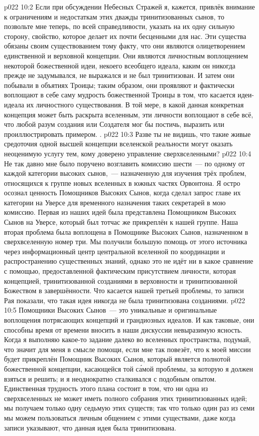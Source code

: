 \vs p022 10:2 \pc Если при обсуждении Небесных Стражей я, кажется, привлёк внимание к ограничениям и недостаткам этих дважды тринитизованных сынов, то позвольте мне теперь, по всей справедливости, указать на их одну сильную сторону, свойство, которое делает их почти бесценными для нас. Эти существа обязаны своим существованием тому факту, что они являются олицетворением единственной и верховной концепции. Они являются личностным воплощением некоторой божественной идеи, некоего всеобщего идеала, каким он никогда прежде не задумывался, не выражался и не был тринитизован. И затем они побывали в объятиях Троицы; таким образом, они проявляют и фактически воплощают в себе саму мудрость божественной Троицы в том, что касается идеи\hyp{}идеала их личностного существования. В той мере, в какой данная конкретная концепция может быть раскрыта вселенным, эти личности воплощают в себе всё, что любой разум создания или Создателя мог бы постичь, выразить или проиллюстрировать примером. .
\vs p022 10:3 Разве ты не видишь, что такие живые средоточия одной высшей концепции вселенской реальности могут оказать неоценимую услугу тем, кому доверено управление сверхвселенными?
\vs p022 10:4 \pc Не так давно мне было поручено возглавить комиссию шести~--- по одному от каждой категории высоких сынов,~--- назначенную для изучения трёх проблем, относящихся к группе новых вселенных в южных частях Орвонтона. Я остро осознал ценность Помощников Высоких Сынов, когда сделал запрос главе их категории на Уверсе для временного назначения таких секретарей в мою комиссию. Первая из наших идей была представлена Помощником Высоких Сынов на Уверсе, который был тотчас же прикреплён к нашей группе. Наша вторая проблема была воплощена в Помощнике Высоких Сынов, назначенном в сверхвселенную номер три. Мы получили большую помощь от этого источника через информационный центр центральной вселенной по координации и распространению существенных знаний, однако это не идёт ни в какое сравнение с помощью, предоставленной фактическим присутствием личности, которая  концепцией, тринитизованной созданиями в верховности и тринитизованной Божеством в завершённости. Что касается нашей третьей проблемы, то записи Рая показали, что такая идея никогда не была тринитизована созданиями.
\vs p022 10:5 \pc Помощники Высоких Сынов~--- это уникальные и оригинальные воплощения потрясающих концепций и грандиозных идеалов. И как таковые, они способны время от времени вносить в наши дискуссии невыразимую ясность. Когда я выполняю какое\hyp{}то задание далеко во вселенных пространства, подумай, что значит для меня в смысле помощи, если мне так повезёт, что к моей миссии будет прикреплён Помощник Высоких Сынов, который является полнотой божественной концепции, касающейся той с\'амой проблемы, за которую я должен взяться и решить; и я неоднократно сталкивался с подобным опытом. Единственная трудность этого плана состоит в том, что ни одна из сверхвселенных не может иметь полного собрания этих тринитизованных идей; мы получаем только одну седьмую этих существ; так что только один раз из семи мы можем пользоваться личным общением с этими существами, даже когда записи указывают, что данная идея была тринитизована.
